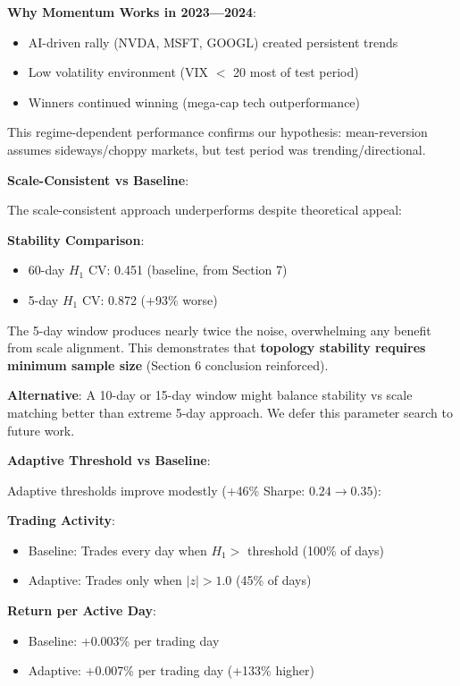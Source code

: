\textbf{Why Momentum Works in 2023---2024}:
\begin{itemize}
\item AI-driven rally (NVDA, MSFT, GOOGL) created persistent trends
\item Low volatility environment (VIX $<$ 20 most of test period)
\item Winners continued winning (mega-cap tech outperformance)
\end{itemize}

This regime-dependent performance confirms our hypothesis: mean-reversion assumes sideways/choppy markets, but test period was trending/directional.

\textbf{Scale-Consistent vs Baseline}:

The scale-consistent approach underperforms despite theoretical appeal:

\textbf{Stability Comparison}:
\begin{itemize}
\item 60-day $H_1$ CV: 0.451 (baseline, from Section 7)
\item 5-day $H_1$ CV: 0.872 (+93\% worse)
\end{itemize}

The 5-day window produces nearly twice the noise, overwhelming any benefit from scale alignment. This demonstrates that \textbf{topology stability requires minimum sample size} (Section 6 conclusion reinforced).

\textbf{Alternative}: A 10-day or 15-day window might balance stability vs scale matching better than extreme 5-day approach. We defer this parameter search to future work.

\textbf{Adaptive Threshold vs Baseline}:

Adaptive thresholds improve modestly (+46\% Sharpe: $0.24 \rightarrow 0.35$):

\textbf{Trading Activity}:
\begin{itemize}
\item Baseline: Trades every day when $H_1 >$ threshold (100\% of days)
\item Adaptive: Trades only when $|z| > 1.0$ (45\% of days)
\end{itemize}

\textbf{Return per Active Day}:
\begin{itemize}
\item Baseline: +0.003\% per trading day
\item Adaptive: +0.007\% per trading day (+133\% higher)
\end{itemize}

